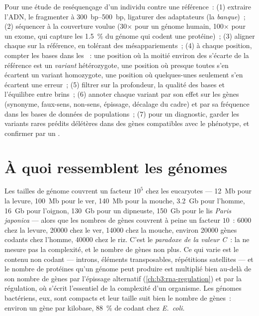 \begin{method}\label{met:b3:genomics:pipeline}
Pour une étude de reséquençage d'un individu contre une référence~:
(1) extraire l'ADN, le fragmenter à \qtyrange{300}{500}{bp}, ligaturer
des adaptateurs (la \emph{banque})~; (2) séquencer à la couverture
voulue (30$\times$ pour un génome humain, 100$\times$ pour un exome, qui
capture les \qty{1.5}{\%} du génome qui codent une protéine)~;
(3) aligner chaque  sur la référence, en tolérant des
mésappariements~; (4) à chaque position, compter les bases dans les
~: une position où la moitié environ des  s'écarte de la
référence est un \emph{variant} hétérozygote, une position où presque
toutes s'en écartent un variant homozygote, une position où quelques-unes
seulement s'en écartent une erreur~; (5) filtrer sur la profondeur, la
qualité des bases et l'équilibre entre brins~; (6) annoter chaque
variant par son effet sur les gènes (synonyme, faux-sens, non-sens,
épissage, décalage du cadre) et par sa fréquence dans les bases de
données de populations~; (7) pour un diagnostic, garder les variants
rares prédits délétères dans des gènes compatibles avec le phénotype, et
confirmer par un .
\end{method}

\section{À quoi ressemblent les génomes}

\begin{proposition}\label{prop:b3:genomics:sizes}
Les tailles de génome couvrent un facteur $10^{5}$ chez les eucaryotes
--- \qty{12}{Mb} pour la levure, \qty{100}{Mb} pour le ver,
\qty{140}{Mb} pour la mouche, \qty{3.2}{Gb} pour l'homme, \qty{16}{Gb}
pour l'oignon, \qty{130}{Gb} pour un dipneuste, \qty{150}{Gb} pour le
lis \emph{Paris japonica} --- alors que les nombres de gènes couvrent à
peine un facteur $10$~: \num{6000} chez la levure, \num{20000} chez le
ver, \num{14000} chez la mouche, environ \num{20000} gènes codants chez
l'homme, \num{40000} chez le riz. C'est le \emph{paradoxe de la valeur
C}~: la  ne mesure pas la complexité, et le nombre de
gènes non plus. Ce qui varie est le contenu non codant --- introns,
éléments transposables, répétitions satellites --- et le nombre de
protéines qu'un génome peut produire est multiplié bien au-delà de son
nombre de gènes par l'épissage alternatif
(\cref{ch:b3:rna-regulation}) et par la régulation, où s'écrit
l'essentiel de la complexité d'un organisme. Les génomes bactériens,
eux, sont compacts et leur taille suit bien le nombre de gènes~: environ
un gène par kilobase, \qty{88}{\%} de codant chez \emph{E.~coli}.
\end{proposition}

